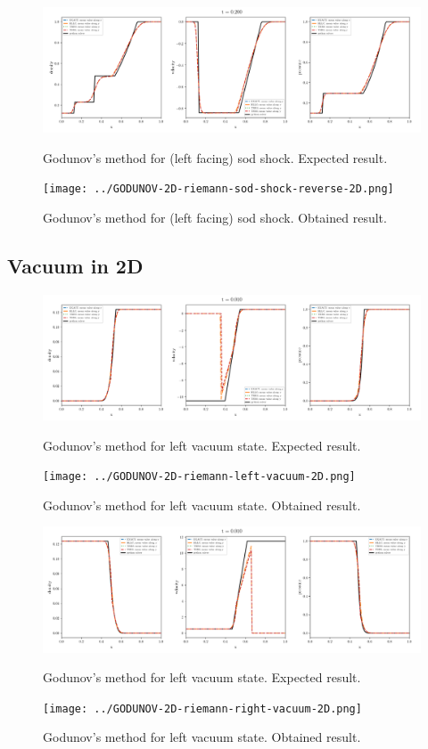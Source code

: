     \begin{figure}[htbp]
        \centering
        \includegraphics[width=.9\textwidth]{./figures/GODUNOV-riemann-sod-shock-reverse-2D.png}%
        \caption{Godunov's method for (left facing) sod shock. Expected result.}
        \texttt{[image: ../GODUNOV-2D-riemann-sod-shock-reverse-2D.png]}%
        \caption{Godunov's method for (left facing) sod shock. Obtained result.}
    \end{figure}










\clearpage
\subsection{Vacuum in 2D}

    \begin{figure}[htbp]
        \centering
        \includegraphics[width=.9\textwidth]{./figures/GODUNOV-riemann-left-vacuum-2D.png}%
        \caption{Godunov's method for left vacuum state. Expected result.}
        \texttt{[image: ../GODUNOV-2D-riemann-left-vacuum-2D.png]}
        \caption{Godunov's method for left vacuum state. Obtained result.}
    \end{figure}


    \begin{figure}[htbp]
        \centering
        \includegraphics[width=.9\textwidth]{./figures/GODUNOV-riemann-right-vacuum-2D.png}%
        \caption{Godunov's method for left vacuum state. Expected result.}
        \texttt{[image: ../GODUNOV-2D-riemann-right-vacuum-2D.png]}
        \caption{Godunov's method for left vacuum state. Obtained result.}
    \end{figure}


